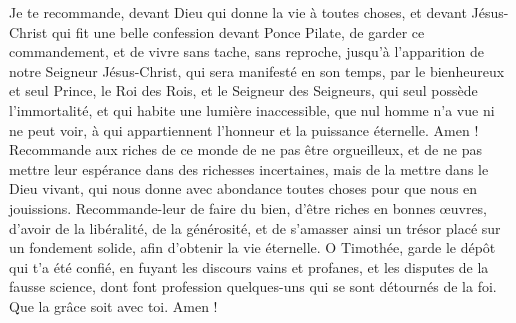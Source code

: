 \begin{multicols}{2}
Je te recommande, devant Dieu qui donne la vie à toutes choses, et devant Jésus-Christ qui fit une belle confession devant Ponce Pilate,
de garder ce commandement, et de vivre sans tache, sans reproche, jusqu’à l'apparition de notre Seigneur Jésus-Christ,
qui sera manifesté en son temps, par le bienheureux et seul Prince, le Roi des Rois, et le Seigneur des Seigneurs,
qui seul possède l'immortalité, et qui habite une lumière inaccessible, que nul homme n'a vue ni ne peut voir, à qui appartiennent l'honneur et la puissance éternelle. Amen !
Recommande aux riches de ce monde de ne pas être orgueilleux, et de ne pas mettre leur espérance dans des richesses incertaines, mais de la mettre dans le Dieu vivant, qui nous donne avec abondance toutes choses pour que nous en jouissions.
Recommande-leur de faire du bien, d’être riches en bonnes œuvres, d’avoir de la libéralité, de la générosité,
et de s’amasser ainsi un trésor placé sur un fondement solide, afin d’obtenir la vie éternelle.
\TextTitle{[Conclusion]}
O Timothée, garde le dépôt qui t’a été confié, en fuyant les discours vains et profanes, et les disputes de la fausse science,
dont font profession quelques-uns qui se sont détournés de la foi. Que la grâce soit avec toi. Amen !
\PPE{}
\end{multicols}
